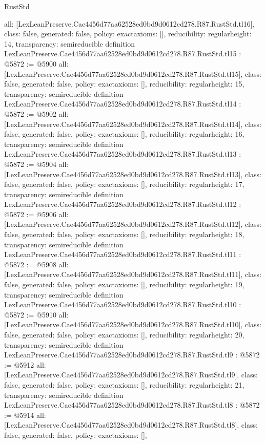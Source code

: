 \begin{lexlean}{RustStd}
\begin{coremodule}
{  all: [LexLeanPreserve.Cae4456d77aa62528ed0bd9d0612cd278.R87.RustStd.tl16],
  class: false,
  generated: false,
  policy: exact{axioms: []},
  reducibility: regular{height: 14},
  transparency: semireducible
}
definition LexLeanPreserve.Cae4456d77aa62528ed0bd9d0612cd278.R87.RustStd.tl15 : @5872 := @5900 {
  all: [LexLeanPreserve.Cae4456d77aa62528ed0bd9d0612cd278.R87.RustStd.tl15],
  class: false,
  generated: false,
  policy: exact{axioms: []},
  reducibility: regular{height: 15},
  transparency: semireducible
}
definition LexLeanPreserve.Cae4456d77aa62528ed0bd9d0612cd278.R87.RustStd.tl14 : @5872 := @5902 {
  all: [LexLeanPreserve.Cae4456d77aa62528ed0bd9d0612cd278.R87.RustStd.tl14],
  class: false,
  generated: false,
  policy: exact{axioms: []},
  reducibility: regular{height: 16},
  transparency: semireducible
}
definition LexLeanPreserve.Cae4456d77aa62528ed0bd9d0612cd278.R87.RustStd.tl13 : @5872 := @5904 {
  all: [LexLeanPreserve.Cae4456d77aa62528ed0bd9d0612cd278.R87.RustStd.tl13],
  class: false,
  generated: false,
  policy: exact{axioms: []},
  reducibility: regular{height: 17},
  transparency: semireducible
}
definition LexLeanPreserve.Cae4456d77aa62528ed0bd9d0612cd278.R87.RustStd.tl12 : @5872 := @5906 {
  all: [LexLeanPreserve.Cae4456d77aa62528ed0bd9d0612cd278.R87.RustStd.tl12],
  class: false,
  generated: false,
  policy: exact{axioms: []},
  reducibility: regular{height: 18},
  transparency: semireducible
}
definition LexLeanPreserve.Cae4456d77aa62528ed0bd9d0612cd278.R87.RustStd.tl11 : @5872 := @5908 {
  all: [LexLeanPreserve.Cae4456d77aa62528ed0bd9d0612cd278.R87.RustStd.tl11],
  class: false,
  generated: false,
  policy: exact{axioms: []},
  reducibility: regular{height: 19},
  transparency: semireducible
}
definition LexLeanPreserve.Cae4456d77aa62528ed0bd9d0612cd278.R87.RustStd.tl10 : @5872 := @5910 {
  all: [LexLeanPreserve.Cae4456d77aa62528ed0bd9d0612cd278.R87.RustStd.tl10],
  class: false,
  generated: false,
  policy: exact{axioms: []},
  reducibility: regular{height: 20},
  transparency: semireducible
}
definition LexLeanPreserve.Cae4456d77aa62528ed0bd9d0612cd278.R87.RustStd.tl9 : @5872 := @5912 {
  all: [LexLeanPreserve.Cae4456d77aa62528ed0bd9d0612cd278.R87.RustStd.tl9],
  class: false,
  generated: false,
  policy: exact{axioms: []},
  reducibility: regular{height: 21},
  transparency: semireducible
}
definition LexLeanPreserve.Cae4456d77aa62528ed0bd9d0612cd278.R87.RustStd.tl8 : @5872 := @5914 {
  all: [LexLeanPreserve.Cae4456d77aa62528ed0bd9d0612cd278.R87.RustStd.tl8],
  class: false,
  generated: false,
  policy: exact{axioms: []},
}
\end{coremodule}
\end{lexlean}
